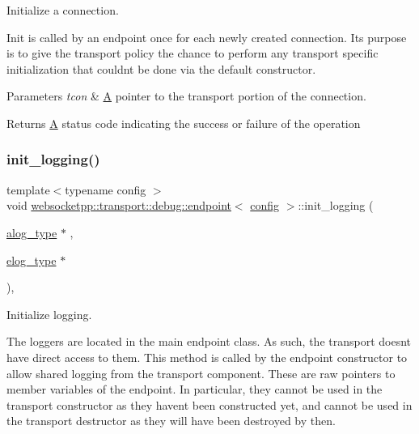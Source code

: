 Initialize a connection. 

Init is called by an endpoint once for each newly created connection. It\textquotesingle{}s purpose is to give the transport policy the chance to perform any transport specific initialization that couldn\textquotesingle{}t be done via the default constructor.


\begin{DoxyParams}{Parameters}
{\em tcon} & \mbox{\hyperlink{struct_a}{A}} pointer to the transport portion of the connection. \\
\hline
\end{DoxyParams}
\begin{DoxyReturn}{Returns}
\mbox{\hyperlink{struct_a}{A}} status code indicating the success or failure of the operation 
\end{DoxyReturn}
\mbox{\label{classwebsocketpp_1_1transport_1_1debug_1_1endpoint_a548d0865fa00469d9ab78daa9ad25c3a}} 
\subsubsection{\texorpdfstring{init\+\_\+logging()}{init\_logging()}}
{\footnotesize\ttfamily template$<$typename config $>$ \\
void \mbox{\hyperlink{classwebsocketpp_1_1transport_1_1debug_1_1endpoint}{websocketpp\+::transport\+::debug\+::endpoint}}$<$ \mbox{\hyperlink{classconfig}{config}} $>$\+::init\+\_\+logging (\begin{DoxyParamCaption}\item[{\mbox{\hyperlink{classwebsocketpp_1_1transport_1_1debug_1_1endpoint_ab2b8a06c2ba2a9ae26def00aefcbc930}{alog\+\_\+type}} $\ast$}]{,  }\item[{\mbox{\hyperlink{classwebsocketpp_1_1transport_1_1debug_1_1endpoint_a3616bf82ba2a1026fad9de8145bd9375}{elog\+\_\+type}} $\ast$}]{ }\end{DoxyParamCaption})\hspace{0.3cm}{\ttfamily [inline]}, {\ttfamily [protected]}}



Initialize logging. 

The loggers are located in the main endpoint class. As such, the transport doesn\textquotesingle{}t have direct access to them. This method is called by the endpoint constructor to allow shared logging from the transport component. These are raw pointers to member variables of the endpoint. In particular, they cannot be used in the transport constructor as they haven\textquotesingle{}t been constructed yet, and cannot be used in the transport destructor as they will have been destroyed by then.


